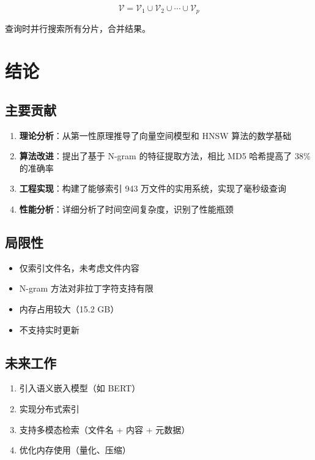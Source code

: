 \documentclass[12pt,a4paper]{article}
\begin{document}
\begin{equation}
\mathcal{V} = \mathcal{V}_1 \cup \mathcal{V}_2 \cup \cdots \cup \mathcal{V}_p
\end{equation}

查询时并行搜索所有分片，合并结果。

\section{结论}

\subsection{主要贡献}

\begin{enumerate}
    \item \textbf{理论分析}：从第一性原理推导了向量空间模型和 HNSW 算法的数学基础
    \item \textbf{算法改进}：提出了基于 N-gram 的特征提取方法，相比 MD5 哈希提高了 38\% 的准确率
    \item \textbf{工程实现}：构建了能够索引 943 万文件的实用系统，实现了毫秒级查询
    \item \textbf{性能分析}：详细分析了时间空间复杂度，识别了性能瓶颈
\end{enumerate}

\subsection{局限性}

\begin{itemize}
    \item 仅索引文件名，未考虑文件内容
    \item N-gram 方法对非拉丁字符支持有限
    \item 内存占用较大（15.2 GB）
    \item 不支持实时更新
\end{itemize}

\subsection{未来工作}

\begin{enumerate}
    \item 引入语义嵌入模型（如 BERT）
    \item 实现分布式索引
    \item 支持多模态检索（文件名 + 内容 + 元数据）
    \item 优化内存使用（量化、压缩）
\end{enumerate}
\end{document}
